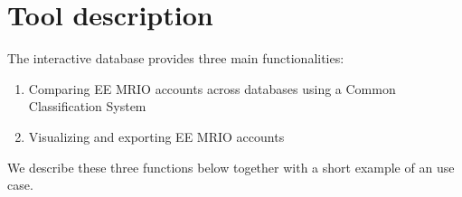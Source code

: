 \section{Tool description}

The interactive database provides three main functionalities:

\begin{enumerate}
\item Comparing EE MRIO accounts across databases using a Common Classification System
\item Visualizing and exporting EE MRIO accounts
\end{enumerate}

We describe these three functions below together with a short example of an use case.
